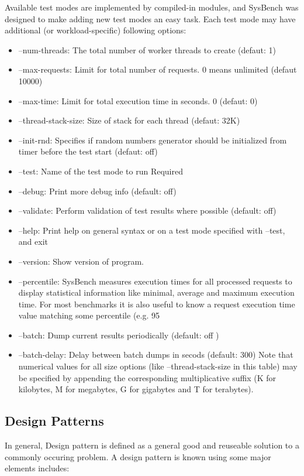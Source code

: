 \documentclass[10pt, conference]{IEEEtran}
\begin{document}
\indent Available test modes are implemented by compiled-in modules, and SysBench was designed to make adding new test modes an easy task. Each test mode may have additional (or workload-specific) following options:
\begin{itemize}
\item --num-threads: The total number of worker threads to create (defaut: 1)
\item --max-requests: Limit for total number of requests. 0 means unlimited (defaut 10000)
\item --max-time: Limit for total execution time in seconds. 0 (defaut: 0)
\item --thread-stack-size: Size of stack for each thread (defaut: 32K)
\item --init-rnd: Specifies if random numbers generator should be initialized from timer before the test start (defaut: off)
\item --test: Name of the test mode to run Required
\item --debug: Print more debug info (default: off)
\item --validate: Perform validation of test results where possible (default: off)
\item --help: Print help on general syntax or on a test mode specified with --test, and exit
\item --version: Show version of program.
\item --percentile: SysBench measures execution times for all processed requests to display statistical information like minimal, average and maximum execution time. For most benchmarks it is also useful to know a request execution time value matching some percentile (e.g. 95%
\item --batch: Dump current results periodically (default: off )
\item --batch-delay: Delay between batch dumps in secods (default: 300) Note that numerical values for all size options (like --thread-stack-size in this table) may be specified by appending the corresponding multiplicative suffix (K for kilobytes, M for megabytes, G for gigabytes and T for terabytes).
\end{itemize}

\subsection{Design Patterns}
\indent In general, Design pattern is defined as a general good and reuseable solution to a commonly occuring problem. A design pattern is known using some major elements includes:
\end{document}
